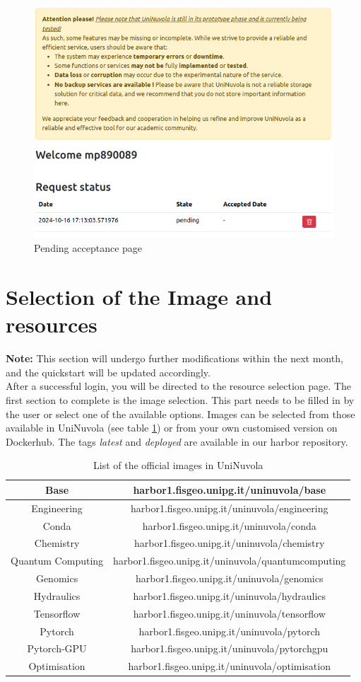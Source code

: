 \documentclass[a4paper,11pt]{article}
\begin{document}
\begin{figure}[!ht]
    \centering
    \includegraphics[width=0.5\linewidth]{img/request_page.png}
    \caption{Pending acceptance page}
    \label{fig:pending}
\end{figure}

\section{Selection of the Image and resources}

\textbf{Note:} This section will undergo further modifications within the next month, and the quickstart will be updated accordingly. \\

After a successful login, you will be directed to the resource selection page. The first section to complete is the image selection. This part needs to be filled in by the user or select one of the available options. Images can be selected from those available in UniNuvola (see table \ref{tab:images}) or from your own customised version on Dockerhub. The tags \textit{latest} and \textit{deployed} are available in our harbor repository.\\

\begin{table}[]
\caption{List of the official images in UniNuvola}
\label{tab:images}
\centering
\begin{tabular}{|c|c|}
\hline
Base & harbor1.fisgeo.unipg.it/uninuvola/base \\ \hline
Engineering & harbor1.fisgeo.unipg.it/uninuvola/engineering \\ \hline
Conda &harbor1.fisgeo.unipg.it/uninuvola/conda \\ \hline
Chemistry & harbor1.fisgeo.unipg.it/uninuvola/chemistry \\ \hline
Quantum Computing & harbor1.fisgeo.unipg.it/uninuvola/quantumcomputing \\ \hline
Genomics & harbor1.fisgeo.unipg.it/uninuvola/genomics \\ \hline
Hydraulics & harbor1.fisgeo.unipg.it/uninuvola/hydraulics \\ \hline
Tensorflow & harbor1.fisgeo.unipg.it/uninuvola/tensorflow  \\ \hline
Pytorch & harbor1.fisgeo.unipg.it/uninuvola/pytorch \\ \hline
Pytorch-GPU & harbor1.fisgeo.unipg.it/uninuvola/pytorchgpu \\ \hline
Optimisation & harbor1.fisgeo.unipg.it/uninuvola/optimisation \\ \hline
\end{tabular}
\end{table}
\end{document}
